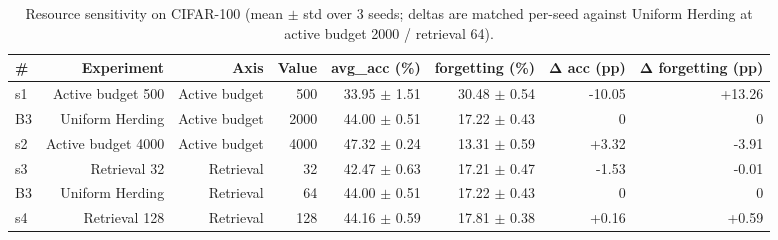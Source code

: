 \documentclass{article}
\begin{document}
\begin{table}[htbp]
  \centering
  \caption{Resource sensitivity on CIFAR-100 (mean $\pm$ std over 3 seeds; deltas are matched per-seed against Uniform Herding at active budget 2000 / retrieval 64).}
  \label{tab:T3_resource_sensitivity}
  \begin{tabular}{lrrrrrrr}
    \toprule
    \textbf{\#} & \textbf{Experiment} & \textbf{Axis} & \textbf{Value} & \textbf{avg\_acc (\%)} & \textbf{forgetting (\%)} & \textbf{Δ acc (pp)} & \textbf{Δ forgetting (pp)} \\
    \midrule
    s1 & Active budget 500 & Active budget & 500 & 33.95 $\pm$ 1.51 & 30.48 $\pm$ 0.54 & -10.05 & +13.26 \\
    B3 & Uniform Herding & Active budget & 2000 & 44.00 $\pm$ 0.51 & 17.22 $\pm$ 0.43 & 0 & 0 \\
    s2 & Active budget 4000 & Active budget & 4000 & 47.32 $\pm$ 0.24 & 13.31 $\pm$ 0.59 & +3.32 & -3.91 \\
    s3 & Retrieval 32 & Retrieval & 32 & 42.47 $\pm$ 0.63 & 17.21 $\pm$ 0.47 & -1.53 & -0.01 \\
    B3 & Uniform Herding & Retrieval & 64 & 44.00 $\pm$ 0.51 & 17.22 $\pm$ 0.43 & 0 & 0 \\
    s4 & Retrieval 128 & Retrieval & 128 & 44.16 $\pm$ 0.59 & 17.81 $\pm$ 0.38 & +0.16 & +0.59 \\
    \bottomrule
  \end{tabular}
\end{table}
\end{document}
